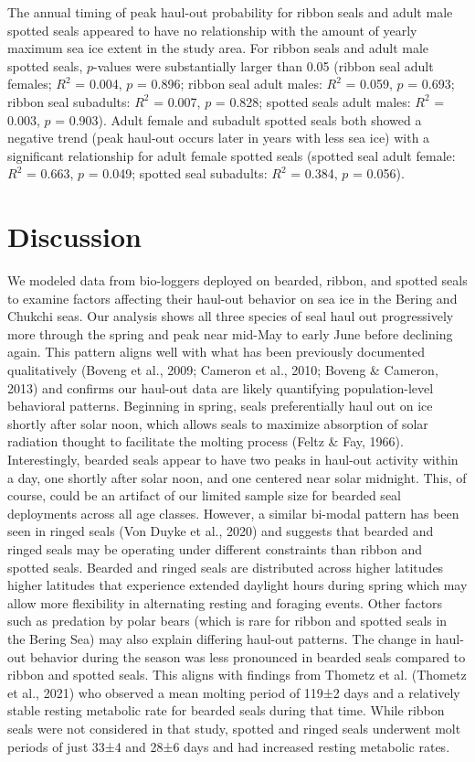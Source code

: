 \documentclass[fleqn,10pt,lineno]{wlpeerj} %
\begin{document}
The annual timing of peak haul-out probability for ribbon seals and adult
male spotted seals appeared to have
no relationship with the amount of yearly maximum sea ice extent in the
study area. For ribbon seals and adult male spotted seals,
\(p\)-values were substantially larger than 0.05 (ribbon seal adult
females; \(R^{2}\) = 0.004, \(p\) = 0.896;
ribbon seal adult males: \(R^{2}\) = 0.059, \(p\) =
0.693; ribbon seal subadults: \(R^{2}\) =
0.007, \(p\) = 0.828; spotted seals
adult males: \(R^{2}\) = 0.003, \(p\) =
0.903). Adult female and subadult spotted seals both
showed a negative trend (peak haul-out occurs later in years with less
sea ice) with a significant relationship for adult female spotted seals
(spotted seal adult female: \(R^{2}\) =
0.663, \(p\) = 0.049; spotted seal
subadults: \(R^{2}\) = 0.384, \(p\) =
0.056).

\hypertarget{discussion}{%
\section*{Discussion}\label{discussion}}

We modeled data from bio-loggers deployed on bearded, ribbon, and spotted seals
to examine factors affecting their haul-out behavior on sea ice in the Bering
and Chukchi seas. Our analysis shows all three species of seal haul out
progressively more through the spring and peak near mid-May to early June before
declining again. This pattern aligns well with what has been previously
documented qualitatively (Boveng et al., 2009; Cameron et al., 2010; Boveng \& Cameron, 2013) and confirms
our haul-out data are likely quantifying population-level behavioral patterns.
Beginning in spring, seals preferentially haul out on ice shortly after solar
noon, which allows seals to maximize absorption of solar radiation thought to
facilitate the molting process (Feltz \& Fay, 1966). Interestingly, bearded seals appear
to have two peaks in haul-out activity within a day, one shortly after solar
noon, and one centered near solar midnight. This, of course, could be an
artifact of our limited sample size for bearded seal deployments across all age
classes. However, a similar bi-modal pattern has been seen in ringed seals
(Von Duyke et al., 2020) and suggests that bearded and ringed seals may be operating
under different constraints than ribbon and spotted seals. Bearded and ringed
seals are distributed across higher latitudes higher latitudes that experience
extended daylight hours during spring which may allow more flexibility in
alternating resting and foraging events. Other factors such as predation by
polar bears (which is rare for ribbon and spotted seals in the Bering Sea) may
also explain differing haul-out patterns. The change in haul-out behavior during
the season was less pronounced in bearded seals compared to ribbon and spotted
seals. This aligns with findings from Thometz et al. (Thometz et al., 2021) who observed
a mean molting period of 119±2 days and a relatively stable resting metabolic
rate for bearded seals during that time. While ribbon seals were not considered
in that study, spotted and ringed seals underwent molt periods of just 33±4
and 28±6 days and had increased resting metabolic rates.
\end{document}
